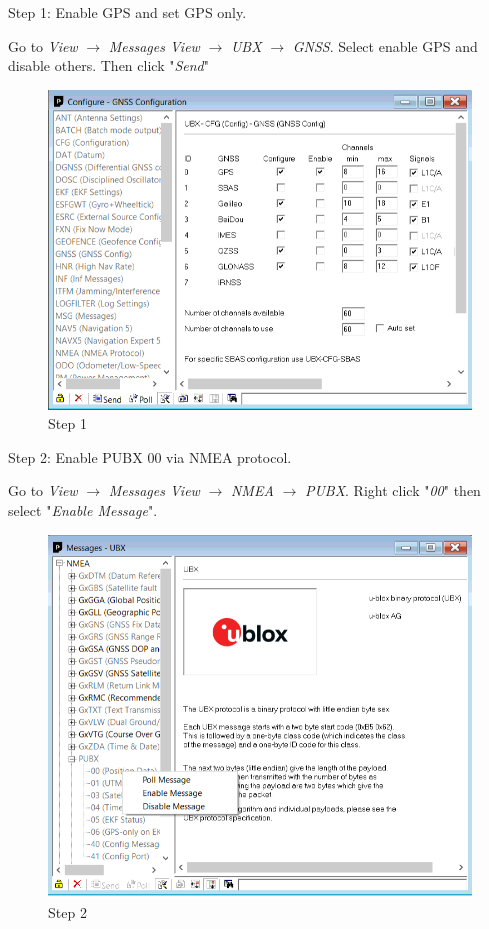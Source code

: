 Step 1: Enable GPS and set GPS only.
 

Go to \emph{View} $\rightarrow$ \emph{Messages View} $\rightarrow$ \emph{UBX} $\rightarrow$ \emph{GNSS}. Select enable GPS and disable others. Then click "\emph{Send}"
\begin{figure}[H]
	\centering
	\includegraphics[scale=0.5]{./graphics/gnssset}
	\caption{Step 1 \label{fig:gnss}}
\end{figure}

Step 2: Enable PUBX 00 via NMEA protocol. 


Go to \emph{View} $\rightarrow$ \emph{Messages View} $\rightarrow$ \emph{NMEA} $\rightarrow$ \emph{PUBX}. Right click "\emph{00}" then select "\emph{Enable Message}".
\begin{figure}[H]
	\centering
	\includegraphics[scale=0.4]{./graphics/pubx00}
	\caption{Step 2 \label{fig:pubx}}
\end{figure}

